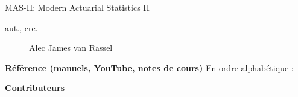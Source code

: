 \begin{contrib}{MAS-II: Modern Actuarial Statistics II}
\begin{description}
	\item[aut., cre.] Alec James van Rassel
\end{description}

\textbf{\underline{Référence (manuels, YouTube, notes de cours)}}
En ordre alphabétique :

\textbf{\underline{Contributeurs}}
\end{contrib}


